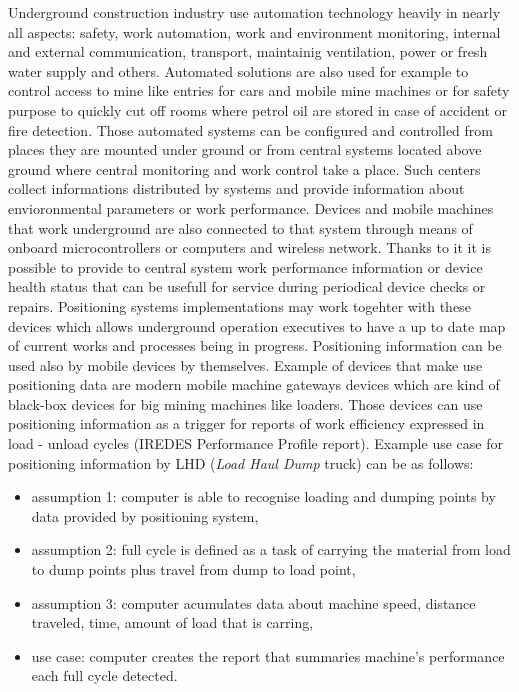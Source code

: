 \documentclass[../main.tex]{subfiles}
\begin{document}
Underground construction industry use automation technology heavily in nearly all aspects: safety, work automation, work and environment monitoring, internal and external communication, transport, maintainig ventilation, power or fresh water supply and others. Automated solutions are also used for example to control access to mine like entries for cars and mobile mine machines or for safety purpose to quickly cut off rooms where petrol oil are stored in case of accident or fire detection. Those automated systems can be configured and controlled from places they are mounted under ground or from central systems located above ground where central monitoring and work control take a place. Such centers collect informations distributed by systems and provide information about envioronmental parameters or work performance. Devices and mobile machines that work underground are also connected to that system through means of onboard microcontrollers or computers and wireless network. Thanks to it it is possible to provide to central system work performance information or device health status that can be usefull for service during periodical device checks or repairs. Positioning systems implementations may work togehter with these devices which allows underground operation executives to have a up to date map of current works and processes being in progress. Positioning information can be used also by mobile devices by themselves. Example of devices that make use positioning data are modern mobile machine gateways devices \cite{Thesis_CM} which are kind of black-box devices for big mining machines like loaders. Those devices can use positioning information as a trigger for reports of work efficiency expressed in load - unload cycles (IREDES Performance Profile report). Example use case for positioning information by LHD (\textit{Load Haul Dump} truck) can be as follows:
\begin{itemize}
	\item assumption 1: computer is able to recognise loading and dumping points by data provided by positioning system,
	\item assumption 2: full cycle is defined as a task of carrying the material from load to dump points plus travel from dump to load point,
	\item assumption 3: computer acumulates data about machine speed, distance traveled, time, amount of load that is carring,
	\item use case: computer creates the report that summaries machine's performance each full cycle detected.
\end{itemize}
\end{document}
